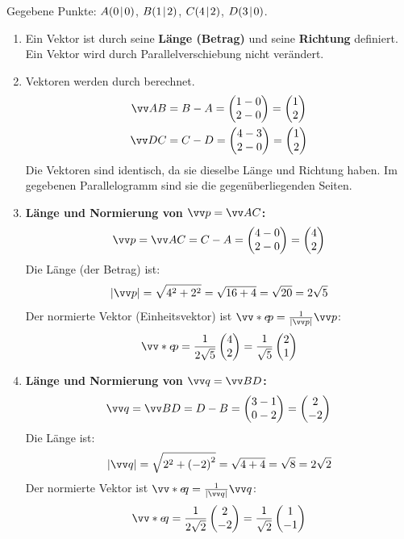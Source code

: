 \documentclass[ngerman]{scrreprt}
\newenvironment{loesungbox}[1]
  {\needspace{5\baselineskip}\begin{loesungboxstyle}[frametitle={#1}]}
  {\end{loesungboxstyle}}
\begin{document}
\begin{loesungbox}{Lösung zu \Cref{aufg:vektorrechnung}}
Gegebene Punkte: $A(0\!\mid\! 0)$, $B(1\!\mid\! 2)$, $C(4\!\mid\! 2)$, $D(3\!\mid\! 0)$.
\begin{enumerate}
    \item Ein Vektor ist durch seine \textbf{Länge (Betrag)} und seine \textbf{Richtung} definiert. Ein Vektor wird durch Parallelverschiebung nicht verändert.

    \item Vektoren werden durch  berechnet.
    \begin{align*}
        \ivec{AB} &= B - A = \icolTwo{1-0}{2-0} = \icolTwo{1}{2} \\
        \ivec{DC} &= C - D = \icolTwo{4-3}{2-0} = \icolTwo{1}{2}
    \end{align*}
    Die Vektoren sind identisch, da sie dieselbe Länge und Richtung haben. Im gegebenen Parallelogramm sind sie die gegenüberliegenden Seiten.
    
    \item \textbf{Länge und Normierung von $\ivec{p} = \ivec{AC}$:}
    \begin{equation*}
        \ivec{p} = \ivec{AC} = C - A = \icolTwo{4-0}{2-0} = \icolTwo{4}{2}
    \end{equation*}
    Die Länge (der Betrag) ist:
    \begin{equation*}
        |\ivec{p}| = \sqrt{4^2 + 2^2} = \sqrt{16+4} = \sqrt{20} = 2\sqrt{5}
    \end{equation*}
    Der normierte Vektor (Einheitsvektor) ist $\ivecS{e}{p} = \frac{1}{|\ivec{p}|}\ivec{p}$:
    \begin{equation*}
        \ivecS{e}{p} = \frac{1}{2\sqrt{5}}\icolTwo{4}{2} = \frac{1}{\sqrt{5}}\icolTwo{2}{1}
    \end{equation*}

    \item \textbf{Länge und Normierung von $\ivec{q} = \ivec{BD}$:}
    \begin{equation*}
        \ivec{q} = \ivec{BD} = D - B = \icolTwo{3-1}{0-2} = \icolTwo{2}{-2}
    \end{equation*}
    Die Länge ist:
    \begin{equation*}
        |\ivec{q}| = \sqrt{2^2 + {(-2)}^2} = \sqrt{4+4} = \sqrt{8} = 2\sqrt{2}
    \end{equation*}
    Der normierte Vektor ist $\ivecS{e}{q} = \frac{1}{|\ivec{q}|}\ivec{q}$:
    \begin{equation*}
        \ivecS{e}{q} = \frac{1}{2\sqrt{2}}\icolTwo{2}{-2} = \frac{1}{\sqrt{2}}\icolTwo{1}{-1}
    \end{equation*}
    

\end{enumerate}
\end{loesungbox}
\end{document}
